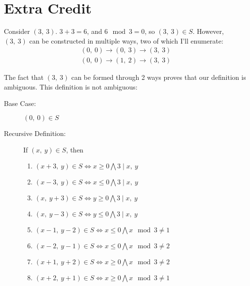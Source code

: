 \documentclass[11pt]{article}
\begin{document}
\section*{Extra Credit}


Consider $ (3,\ 3) $. $3 + 3 =6$, and $6 \mod 3 = 0$, so $(3,\ 3) \in S$. However, $(3,\ 3)$ can be constructed in multiple ways, two of which I'll enumerate:
	\begin{align*}
		(0,\ 0) \rightarrow 	(0,\ 3) \rightarrow (3,\ 3)\\
		(0,\ 0) \rightarrow 	(1,\ 2) \rightarrow (3,\ 3)
	\end{align*}

The fact that $(3,\ 3)$ can be formed through 2 ways proves that our definition is ambiguous. This definition is not ambiguous:

\begin{description}

	\item[Base Case:] $(0,\ 0)\in S$

	\item[Recursive Definition:] If $(x,\ y) \in S$, then

	\begin{enumerate}[{}]
		\item $(x + 3,\ y) \in S \iff x \ge 0 \bigwedge 3 \mid x,\ y$
		\item $(x - 3,\ y) \in S \iff x \le 0 \bigwedge 3 \mid x,\ y$
		\item $(x,\ y + 3) \in S \iff y \ge 0 \bigwedge 3 \mid x,\ y$
		\item $(x,\ y - 3) \in S \iff y \le 0 \bigwedge 3 \mid x,\ y$ 
		\item $(x -1,\ y-2) \in S \iff x \le 0 \bigwedge x \mod 3 \neq 1 $
		\item $(x -2,\ y-1) \in S \iff x \le 0 \bigwedge x \mod 3 \neq 2 $ 
		\item $(x +1,\ y+2) \in S \iff x \ge 0 \bigwedge x \mod 3 \neq 2 $
		\item $(x +2,\ y+1) \in S \iff x \ge 0 \bigwedge x \mod 3 \neq 1 $
	\end{enumerate}		


\end{description}
\end{document}
